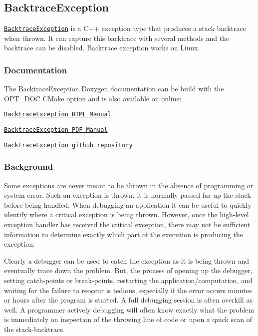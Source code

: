 \href{https://travis-ci.org/markjolah/BacktraceException}{\tt } \subsection*{Backtrace\+Exception}

\href{https://markjolah.github.io/BacktraceException/classbacktrace__exception_1_1BacktraceException.html}{\tt {\ttfamily Backtrace\+Exception}} is a C++ exception type that produces a stack backtrace when thrown. It can capture this backtrace with several methods and the backtrace can be disabled. Backtrace exception works on Linux.

\subsubsection*{Documentation}

The Backtrace\+Exception Doxygen documentation can be build with the {\ttfamily O\+P\+T\+\_\+\+D\+OC} C\+Make option and is also available on online\+:
\begin{DoxyItemize}
\item \href{https://markjolah.github.io/BacktraceException/index.html}{\tt Backtrace\+Exception H\+T\+ML Manual}
\item \href{https://markjolah.github.io/BacktraceException/pdf/BacktraceException-0.2-reference.pdf}{\tt Backtrace\+Exception P\+DF Manual}
\item \href{https://github.com/markjolah/BacktraceException}{\tt Backtrace\+Exception github repository}
\end{DoxyItemize}

\subsubsection*{Background}

Some exceptions are never meant to be thrown in the absence of programming or system error. Such an exception is thrown, it is normally passed far up the stack before being handled. When debugging an application it can be useful to quickly identify where a critical exception is being thrown. However, once the high-\/level exception handler has received the critical exception, there may not be sufficient information to determine exactly which part of the execution is producing the exception.

Clearly a debugger can be used to catch the exception as it is being thrown and eventually trace down the problem. But, the process of opening up the debugger, setting catch-\/points or break-\/points, restarting the application/computation, and waiting for the failure to reoccur is tedious, especially if the error occurs minutes or hours after the program is started. A full debugging session is often overkill as well. A programmer actively debugging will often know exactly what the problem is immediately on inspection of the throwing line of code or upon a quick scan of the stack-\/backtrace.

